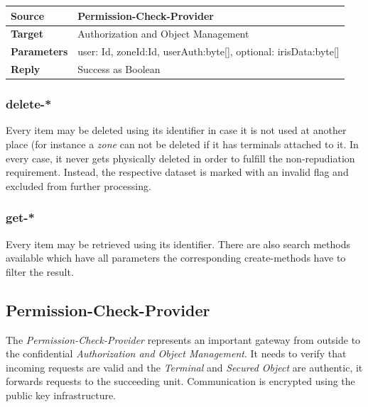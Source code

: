 \documentclass[12pt,a4paper,titlepage,oneside]{scrartcl}
\begin{document}
\begin{table}[h]

    \centering

    \begin{tabular}{|l|p{12cm}|} \hline

    \textbf{Source}&Permission-Check-Provider\\ \hline

    \textbf{Target}&Authorization and Object Management\\ \hline

    \textbf{Parameters}& user: Id, zoneId:Id, userAuth:byte[], optional: irisData:byte[]\\ \hline

    \textbf{Reply}&Success as Boolean\\ \hline

    \end{tabular}

\end{table}

\subsubsection{delete-*}

Every item may be deleted using its identifier in case it is not used at another place (for instance a \emph{zone} can not be deleted if it has terminals attached to it. In every case, it never gets physically deleted in order to fulfill the non-repudiation requirement. Instead, the respective dataset is marked with an invalid flag and excluded from further processing.

\subsubsection{get-*}

Every item may be retrieved using its identifier. There are also search methods available which have all parameters the corresponding create-methods have to filter the result.

\subsection{Permission-Check-Provider}

The \emph{Permission-Check-Provider} represents an important gateway from outside to the confidential \emph{Authorization and Object Management}. It needs to verify that incoming requests are valid and the \emph{Terminal} and \emph{Secured Object} are authentic, it forwards requests to the succeeding unit. Communication is encrypted using the public key infrastructure.
\end{document}
